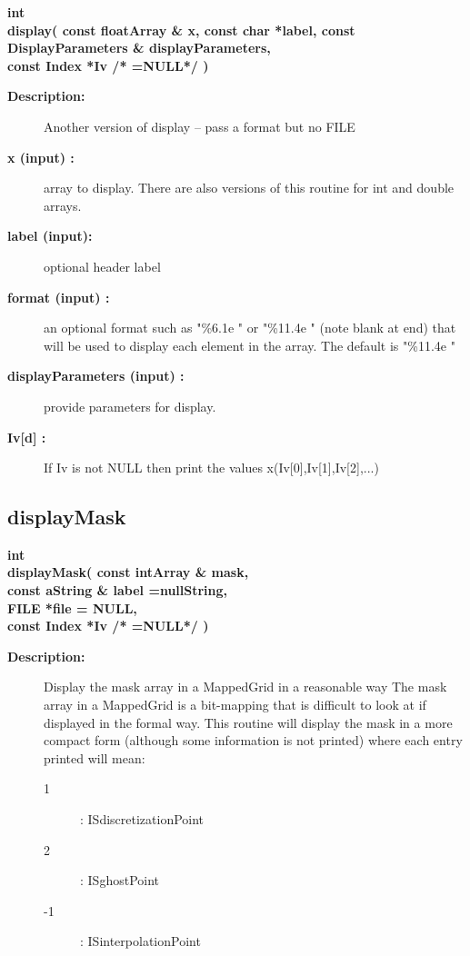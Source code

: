 \begin{flushleft} \textbf{%
int \\ 
\settowidth{\displayIncludeArgIndent}{display(}%
display( const floatArray \& x, const char *label, const DisplayParameters \& displayParameters, \\ 
\hspace{\displayIncludeArgIndent}const Index *Iv /* =NULL*/ )
}\end{flushleft}
\begin{description}
\item[{\bf Description:}] 
      Another version of display -- pass a format but no FILE
\item[{\bf x (input) :}]  array to display. There are also versions of this routine for int and double arrays.
\item[{\bf label (input):}]  optional header label
\item[{\bf format (input) :}]  an optional format such as "\%6.1e " or "\%11.4e " (note blank at end) 
  that will be used to display each element in the array. The default is "\%11.4e "
\item[{\bf displayParameters (input) :}]  provide parameters for display. 
\item[{\bf Iv[d] :}]  If Iv is not NULL then print the values x(Iv[0],Iv[1],Iv[2],...)
\end{description}
\subsection{displayMask}
 
\begin{flushleft} \textbf{%
int  \\ 
\settowidth{\displayIncludeArgIndent}{displayMask(}%
displayMask( const intArray \& mask, \\ 
\hspace{\displayIncludeArgIndent}const aString \& label  =nullString,\\ 
\hspace{\displayIncludeArgIndent}FILE *file  = NULL, \\ 
\hspace{\displayIncludeArgIndent}const Index *Iv /* =NULL*/ )
}\end{flushleft}
\begin{description}
\item[{\bf Description:}] 
 Display the mask array in a MappedGrid in a reasonable way
 The mask array in a MappedGrid is a bit-mapping that is difficult to look at
 if displayed in the formal way. This routine will display the mask in a more
 compact form (although some information is not printed) where each entry printed will mean:
 \begin{description}
   \item[1] : ISdiscretizationPoint
   \item[2] : ISghostPoint
   \item[-1] : ISinterpolationPoint
 \end{description}   
\end{description}
